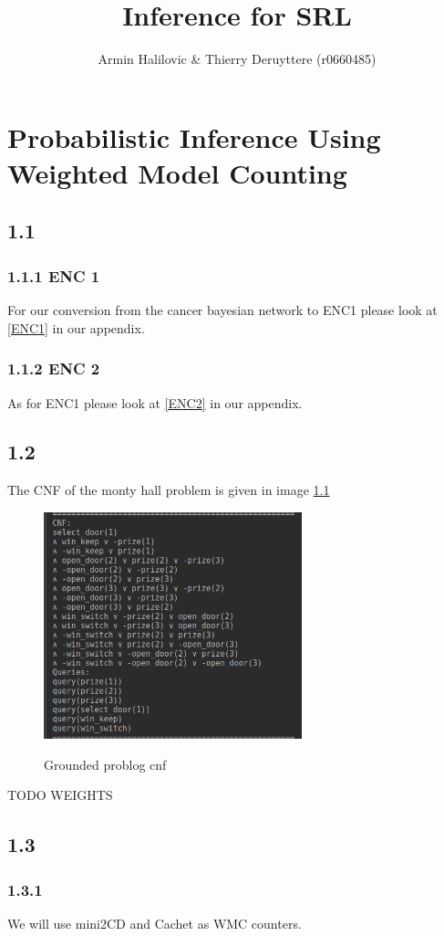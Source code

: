\documentclass[a4paper,10pt]{report}
\title{Inference for SRL}
\author{Armin Halilovic \& Thierry Deruyttere (r0660485)}
\begin{document}
\maketitle
\chapter{Probabilistic Inference Using Weighted Model Counting}
\section*{1.1}
\subsection*{1.1.1 ENC 1}
For our conversion from the cancer bayesian network to ENC1 please look at \ref{ENC1} in our appendix.
\subsection*{1.1.2 ENC 2}
As for ENC1 please look at \ref{ENC2} in our appendix.

\section*{1.2}
The CNF of the monty hall problem is given in image \ref{CNF}
\begin{figure}[H]
  \includegraphics[width=7.5cm]{GroundProblogCNF.png}
  \label{CNF}
  \caption{Grounded problog cnf}
\end{figure}
TODO WEIGHTS

\section*{1.3}

\subsection*{1.3.1}
We will use mini2CD and Cachet as WMC counters.
\end{document}
